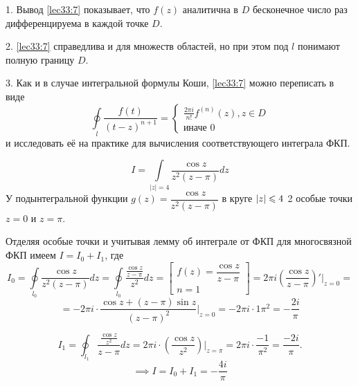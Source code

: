 \documentclass[../../main.tex]{subfiles}
\begin{document}
	\begin{rems}
	 \item[1.] Вывод \eqref{lec33:7} показывает, что $f(z)$ аналитична в 
	 $D$ бесконечное число раз дифференцируема в каждой точке
	 $D$.
	 \item[2.] \eqref{lec33:7} справедлива и для множеств
	  областей, но при этом под $l$ понимают полную границу $D$.
	  
	  \item[3.] Как и в случае интегральной формулы Коши, 
	  \eqref{lec33:7} можно переписать в виде 
	  \[
	   \oint\limits_l \frac{f(t)}{(t-z)^{n+1}} = 
	   \begin{cases}
	    \frac{2\pi i}{n!} f^{(n)}(z), z \in D \\
	    \text{иначе 0}
	   \end{cases}
	  \]
	  и исследовать её на практике для вычисления
	  соответствующего интеграла ФКП.
	\end{rems}
    \begin{exmp}
     \[
      I = \int\limits_{|z|=4}\frac{\cos z}{z^2 (z-\pi)}
      dz
     \]
     У подынтегральной функции $g(z)=\dfrac{\cos z}
     {z^2(z-\pi)}$ в круге $\left|{z}\right| \leqslant 4$
     2 особые точки $z=0$ и $z=\pi$.
     
     
     Отделяя особые точки и учитывая лемму об 
     интеграле от ФКП для многосвязной ФКП имеем 
     $I = I_0 + I_1$, где 
     \[
      I_0 = 
     \oint\limits_{l_0}\dfrac{\cos z}{z^2(z - \pi)} 
     dz=
     \oint\limits_{l_0}\dfrac{\frac{\cos z}
     {z-\pi}}{z^2} dz
     = \left[
     \begin{array}{l}
      f(z) = \dfrac{\cos z}{z-\pi} \\
     n = 1
     \end{array}
     \right] = 
     2\pi i \left( \dfrac{\cos z}{z-\pi}\right)'
     |_{z=0}=
     \]
     \[= -2\pi i \cdot \dfrac{\cos z + 
     (z - \pi) \sin z}{(z-\pi)^2}|_{z=0}=
     -2\pi i \cdot {1}{\pi ^2} = -\dfrac{2i}{\pi}
     \]

     \[
      I_1 = \oint_{l_1} \dfrac{\frac{\cos z}{z^2}}
      {z-\pi} dz = 2 \pi i \cdot \left(
      \dfrac{\cos z}{z^2}
      \right) |_{z=\pi} = 2\pi i \cdot \dfrac{-1}{\pi^2}
      =\dfrac{-2i}{\pi}.
     \]
     \[
      \implies I = I_0 + I_1 = -\dfrac{4i}{\pi}
     \]
    \end{exmp}
\end{document}
